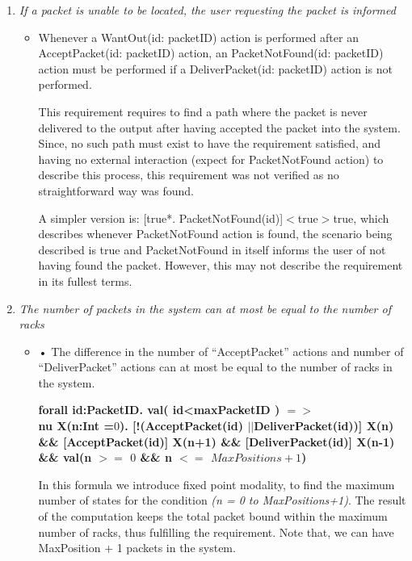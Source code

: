 \begin{enumerate}
\begin{itemize}
	\textbf{forall id: PacketID.val(id $<$ maxPacketID) $=>$ $\\$ [(!AcceptPacket(id))*. AcceptPacket(id). (!(DeliverPacket(id)))*.\\ WantOut(id)] $<$(!DeliverPacket(id))*.DeliverPacket(id)$>$ true}
	
\end{itemize}

\item \textit{If a packet is unable to be located, the user requesting the packet is informed }
	\begin{itemize}	
	\item  Whenever a WantOut(id: packetID) action is performed after an 
	AcceptPacket(id: packetID) action, an PacketNotFound(id: packetID) action must be performed if a DeliverPacket(id: packetID) action is not performed.

This requirement requires to find a path where the packet is never delivered to the output after having accepted the packet into the system. Since, no such path must exist to have the requirement satisfied, and having no external interaction (expect for PacketNotFound action) to describe this process, this requirement was not verified as no straightforward way was found.

A simpler version is: [true*. PacketNotFound(id)]$<$true$>$true, which describes whenever PacketNotFound action is found, the scenario being described is true and PacketNotFound in itself informs the user of not having found the packet. However, this may not describe the requirement in its fullest terms.
 
\end{itemize}

\item \textit{The number of packets in the system can at most be equal to the number of racks}
	\begin{itemize}
	\item •	The difference in the number of “AcceptPacket” actions and number of “DeliverPacket” actions can at most be equal to the number of racks in the system.
	
\textbf{forall id:PacketID. val( id<maxPacketID ) $=>$ \\ nu X(n:Int =$0$). [!(AcceptPacket(id) $||$DeliverPacket(id))] X(n)\\ \&\& [AcceptPacket(id)] X(n+1) \&\& [DeliverPacket(id)] X(n-1)\\ \&\& val(n $>=$ $0$ \&\& n $<=$ $MaxPositions+1$)}	

In this formula we introduce fixed point modality, to find the maximum number of states for the condition \textit{(n = 0 to MaxPositions+1)}. The result of the computation keeps the total packet bound within the maximum number of racks, thus fulfilling the requirement. Note that, we can have MaxPosition + 1 packets in the system.

	\end{itemize}
\end{enumerate}
